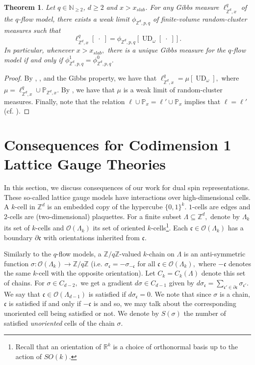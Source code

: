\documentclass[article,11pt,reqno]{amsart}
\newcommand{\Prb}{\mathbb{P}}
\newtheorem{theorem}{Theorem}[section]
\begin{document}
\begin{theorem}  \label{thm:Unique_loop_qversion}
Let $q\in \mathbb{N}_{\geq 2}$, $d\geq 2$ and $x>x_{slab}$. For any Gibbs measure $\ell^q_{\mathbb{Z}^d,x}$ of the $q$-flow model, there exists a weak limit $\phi_{\mathbb{Z}^d,p,q}$ of finite-volume random-cluster measures such that 
$$
\ell^q_{\mathbb{Z}^d,x}[\;\cdot\;]=\phi_{\mathbb{Z}^d,p,q}[\operatorname{UD}_{\omega}[\;\cdot\;]].
$$
In particular, whenever $x>x_{slab},$ there is a unique Gibbs measure for the $q$-flow model if and only if $\phi^1_{\mathbb{Z}^d,p,q}=\phi^0_{\mathbb{Z}^d,p,q}$.
\end{theorem}
\begin{proof}
By , ,  and the Gibbs property, we have that $\ell^q_{\mathbb{Z}^d,x}=\mu[\operatorname{UD}_{\omega}],$ where $\mu=\ell^q_{\mathbb{Z}^d,x}\cup \mathbb{P}_{\mathbb{Z}^d,x}.$ By , we have that $\mu$ is a weak limit of random-cluster measures. Finally, note that the relation $\ell \cup \Prb_{x} = \ell' \cup \Prb_{x}$ implies that $\ell = \ell'$ (cf. \cite[Claim B.5.]{hansen2025general}).
\end{proof}

\section{Consequences for Codimension 1 Lattice Gauge Theories} \label{sec:gauge}
In this section, we discuss consequences of our work for dual spin representations. These so-called lattice gauge models have interactions over high-dimensional cells. A $k$-cell in $\mathbb{Z}^d$ is an embedded copy of the hypercube $\{0,1\}^{k}$. $1$-cells are edges and $2$-cells are (two-dimensional) plaquettes. For a finite subset $\Lambda\subseteq \mathbb{Z}^d,$ denote by $\Lambda_{k}$ its set of $k$-cells and $\mathcal{O}(\Lambda_{k})$ its set of oriented $k$-cells\footnote{Recall that an orientation of $\mathbb{R}^k$ is a choice of orthonormal basis up to the action of $SO(k)$.}. Each $\mathfrak{c}\in \mathcal{O}(\Lambda_k)$ has a boundary $\partial \mathfrak{c}$ with orientations inherited from $\mathfrak{c}.$

Similarly to the $q$-flow models, a $\mathbb{Z}/q\mathbb{Z}$-valued $k$-chain on $\Lambda$ is an anti-symmetric function $\sigma:\mathcal{O}(\Lambda_{k})\to \mathbb{Z}/q\mathbb{Z}$ (i.e. $\sigma_{\mathfrak{c}}=-\sigma_{-\mathfrak{c}}$ for all $\mathfrak{c}\in \mathcal{O}(\Lambda_{k}),$ where $-\mathfrak{c}$ denotes the same $k$-cell with the opposite orientation). Let $C_{k}=C_{k}(\Lambda)$ denote this set of chains. For $\sigma\in C_{d-2},$ we get a gradient $d\sigma\in C_{d-1}$ given by $d\sigma_{\mathfrak{c}}=\sum_{\mathfrak{c'}\in \partial \mathfrak{c}} \sigma_{\mathfrak{c'}}.$ We say that $\mathfrak{c}\in \mathcal{O}(\Lambda_{d-1})$ is satisfied if $d\sigma_{\mathfrak{c}}=0$. We note that since $\sigma$ is a chain, $\mathfrak{c}$ is satisfied if and only if $-\mathfrak{c}$ is and so, we may talk about the corresponding unoriented cell being satisfied or not. We denote by $S(\sigma)$ the number of satisfied \emph{unoriented} cells of the chain $\sigma$.
\end{document}
